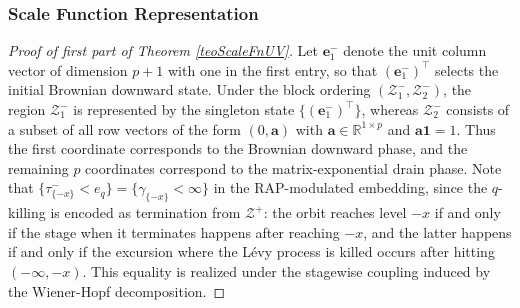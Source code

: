 \documentclass[a4paper,11pt]{article}
\newcommand{\correction}[1]{{\textcolor{blue}{#1}}}
\numberwithin{equation}{section}
\theoremstyle{plain}
\theoremstyle{definition}
\newcommand{\1}{\mathbf{1}}
\begin{document}
\subsubsection{Scale Function Representation}

\begin{proof}[Proof of first part of Theorem \ref{teoScaleFnUV}]
Let $\bm{e}_1^-$ denote the unit column vector of dimension $p+1$ with one in the first entry, so that $(\bm{e}_1^-)^\intercal$ selects the initial Brownian downward state. Under the block ordering $(\mathcal{Z}_1^-,\mathcal{Z}_2^-)$, the region $\mathcal{Z}_1^-$ is represented by the singleton state $\{(\bm{e}_1^-)^\intercal\}$, whereas $\mathcal{Z}_2^-$ consists of a subset of all row vectors of the form $(0,\bm{a})$ with $\bm{a}\in\mathbb{R}^{1\times p}$ and $\bm{a}\bm{1}=1$. Thus the first coordinate corresponds to the Brownian downward phase, and the remaining $p$ coordinates correspond to the matrix-exponential drain phase.
Note that $\{\tau^-_{\{-x\}} < e_q\} = \{\gamma_{\{-x\}} < \infty\}$ in the RAP-modulated embedding, since the $q$-killing is encoded as termination from $\mathcal{Z}^+$: the orbit reaches level $-x$ if and only if the stage when it terminates happens after reaching $-x$, and the latter happens if and only if the excursion where the L\'evy process is killed occurs after hitting $(-\infty,-x)$. 
This equality is realized under the stagewise coupling induced by the Wiener-Hopf decomposition. 



\end{proof}
\end{document}
